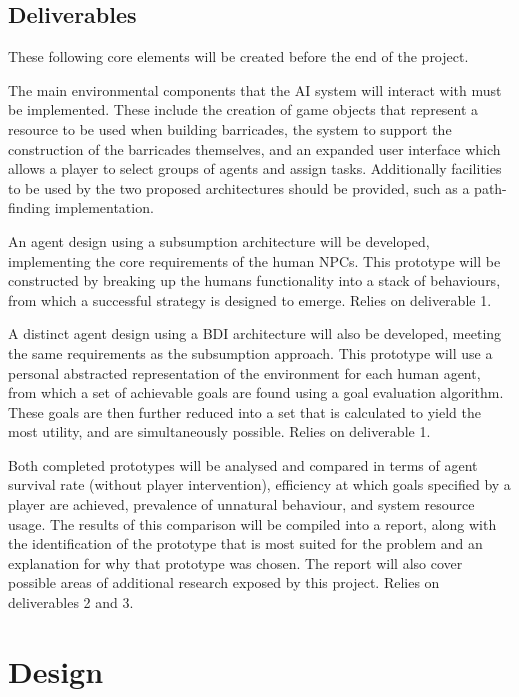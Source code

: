 \documentclass[12pt,a4paper]{article}
\begin{document}
\subsection{Deliverables}\noindent
These following core elements will be created before the end of the project.

\begin{enumerate}
  {The main environmental components that the AI system will interact with must be implemented. These include the creation of game objects that represent a resource to be used when building barricades, the system to support the construction of the barricades themselves, and an expanded user interface which allows a player to select groups of agents and assign tasks. Additionally facilities to be used by the two proposed architectures should be provided, such as a path-finding implementation.}

  {An agent design using a subsumption architecture will be developed, implementing the core requirements of the human NPCs. This prototype will be constructed by breaking up the humans functionality into a stack of behaviours, from which a successful strategy is designed to emerge. Relies on deliverable 1.}

  {A distinct agent design using a BDI architecture will also be developed, meeting the same requirements as the subsumption approach. This prototype will use a personal abstracted representation of the environment for each human agent, from which a set of achievable goals are found using a goal evaluation algorithm. These goals are then further reduced into a set that is calculated to yield the most utility, and are simultaneously possible. Relies on deliverable 1.}

  {Both completed prototypes will be analysed and compared in terms of agent survival rate (without player intervention), efficiency at which goals specified by a player are achieved, prevalence of unnatural behaviour, and system resource usage. The results of this comparison will be compiled into a report, along with the identification of the prototype that is most suited for the problem and an explanation for why that prototype was chosen. The report will also cover possible areas of additional research exposed by this project. Relies on deliverables 2 and 3.}
\end{enumerate}

\section{Design}
\end{document}
